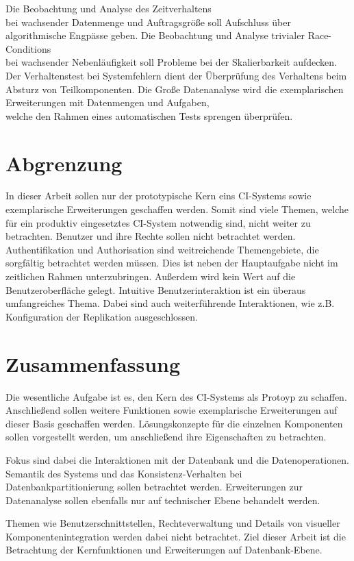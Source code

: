 \begin{description}
    Die Beobachtung und Analyse des Zeitverhaltens \\
    bei wachsender Datenmenge und Auftragsgröße soll Aufschluss über algorithmische Engpässe geben.
    Die Beobachtung und Analyse trivialer Race-Conditions \\
    bei wachsender Nebenl\"aufigkeit soll Probleme bei der Skalierbarkeit aufdecken.
      Der Verhaltenstest bei Systemfehlern dient der
    \"Uberpr\"ufung des Verhaltens beim Absturz von Teilkomponenten.
    Die Große Datenanalyse wird die exemplarischen Erweiterungen mit Datenmengen und Aufgaben, \\
    welche den Rahmen eines automatischen Tests sprengen überprüfen.
\end{description}


\section{Abgrenzung}

In dieser Arbeit sollen nur der prototypische Kern eins \ac{CI}-Systems
sowie exemplarische Erweiterungen geschaffen werden.
Somit sind viele Themen, welche für ein produktiv eingesetztes \ac{CI}-System notwendig
sind, nicht weiter zu betrachten.
Benutzer und ihre Rechte sollen nicht betrachtet werden.
Authentifikation und Authorisation sind weitreichende Themengebiete,
die sorgfältig betrachtet werden müssen.
Dies ist neben der Hauptaufgabe nicht im zeitlichen Rahmen unterzubringen.
Außerdem wird kein Wert auf die Benutzeroberfläche gelegt.
Intuitive Benutzerinteraktion ist ein überaus umfangreiches Thema.
Dabei sind auch weiterführende Interaktionen,
wie z.B. Konfiguration der Replikation ausgeschlossen.


\section{Zusammenfassung}


Die wesentliche Aufgabe ist es, den Kern des \ac{CI}-Systems als Protoyp zu schaffen.
Anschließend sollen weitere Funktionen sowie exemplarische Erweiterungen
auf dieser Basis geschaffen werden.
L\"osungskonzepte f\"ur die einzelnen Komponenten sollen vorgestellt werden,
um anschließend ihre Eigenschaften zu betrachten.

Fokus sind dabei die Interaktionen mit der Datenbank und die Datenoperationen.
Semantik des Systems und das Konsistenz-Verhalten bei Datenbankpartitionierung
sollen betrachtet werden. Erweiterungen zur Datenanalyse sollen ebenfalls nur auf technischer Ebene behandelt werden.

Themen wie Benutzerschnittstellen, Rechteverwaltung und Details
von visueller Komponentenintegration werden dabei nicht betrachtet.
Ziel dieser Arbeit ist die Betrachtung der Kernfunktionen und Erweiterungen auf Datenbank-Ebene.

